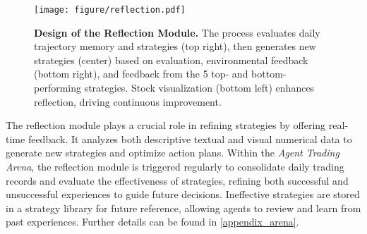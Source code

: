 \begin{figure}[t]
	\centering
	\texttt{[image: figure/reflection.pdf]}
	\caption{\textbf{Design of the Reflection Module.} The process evaluates daily trajectory memory and strategies (top right), then generates new strategies (center) based on evaluation, environmental feedback (bottom right), and feedback from the 5 top- and bottom-performing strategies. Stock visualization (bottom left) enhances reflection, driving continuous improvement.}
	\label{fig:reflection}
	\vspace{-3pt}
\end{figure}


The reflection module plays a crucial role in refining strategies by offering real-time feedback. It analyzes both descriptive textual and visual numerical data to generate new strategies and optimize action plans. Within the \textit{Agent Trading Arena}, the reflection module is triggered regularly to consolidate daily trading records and evaluate the effectiveness of strategies, refining both successful and unsuccessful experiences to guide future decisions. Ineffective strategies are stored in a strategy library for future reference, allowing agents to review and learn from past experiences. Further details can be found in \autoref{appendix_arena}.
